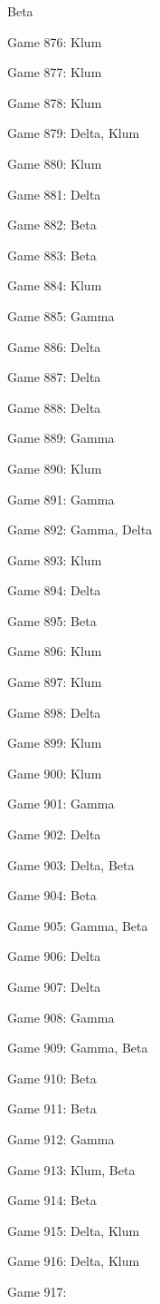 \documentclass{article}
\begin{document}
\begin{multicols}{3}
\begin{compactitem}
Beta
\item Game 876:
Klum
\item Game 877:
Klum
\item Game 878:
Klum
\item Game 879:
Delta, Klum
\item Game 880:
Klum
\item Game 881:
Delta
\item Game 882:
Beta
\item Game 883:
Beta
\item Game 884:
Klum
\item Game 885:
Gamma
\item Game 886:
Delta
\item Game 887:
Delta
\item Game 888:
Delta
\item Game 889:
Gamma
\item Game 890:
Klum
\item Game 891:
Gamma
\item Game 892:
Gamma, Delta
\item Game 893:
Klum
\item Game 894:
Delta
\item Game 895:
Beta
\item Game 896:
Klum
\item Game 897:
Klum
\item Game 898:
Delta
\item Game 899:
Klum
\item Game 900:
Klum
\item Game 901:
Gamma
\item Game 902:
Delta
\item Game 903:
Delta, Beta
\item Game 904:
Beta
\item Game 905:
Gamma, Beta
\item Game 906:
Delta
\item Game 907:
Delta
\item Game 908:
Gamma
\item Game 909:
Gamma, Beta
\item Game 910:
Beta
\item Game 911:
Beta
\item Game 912:
Gamma
\item Game 913:
Klum, Beta
\item Game 914:
Beta
\item Game 915:
Delta, Klum
\item Game 916:
Delta, Klum
\item Game 917:

\end{compactitem}
\end{multicols}
\end{document}
